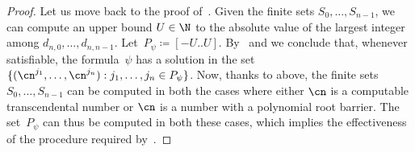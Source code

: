 \begin{proof}
  Let us move back to the proof of~. Given
  the finite sets $S_0,\dots,S_{n-1}$, we can compute an upper bound $U \in \N$
  to the absolute value of the largest integer among $d_{n,0},\dots,d_{n,n-1}$.
  Let~$P_{\psi} \coloneqq [-U..U]$. By~ and we
  conclude that, whenever satisfiable, the formula~$\psi$ has a solution in the set
  $\{(\cn^{j_1},\dots,\cn^{j_n}) : j_1, \dots, j_n \in P_{\psi} \}$. Now, thanks to
   above, the finite sets $S_0,\dots,S_{n-1}$ can
  be computed in both the cases where either $\cn$ is a computable
  transcendental number or $\cn$ is a number with a polynomial root barrier. The
  set~$P_{\psi}$ can thus be computed in both these cases, which implies the
  effectiveness of the procedure required
  by~.


\end{proof}

